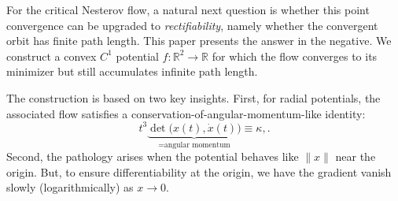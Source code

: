 \documentclass{article}
\theoremstyle{remark}
\begin{document}




For the critical Nesterov flow, a natural next question is whether this point convergence can be upgraded to \emph{rectifiability}, namely whether the convergent orbit has finite path length. This paper presents the answer in the negative. We construct a convex $C^1$ potential $f\colon \mathbb{R}^2\rightarrow\mathbb{R}$ for which the flow converges to its minimizer but still accumulates infinite path length.



The construction is based on two key insights. First, for radial potentials, the associated flow satisfies a conservation-of-angular-momentum-like identity:
\[
  t^3
  \!\!\!
\underbrace{
  \det\big(x(t),\dot x(t)\big)}_{=\text{angular momentum}}\!\!\equiv \kappa,.
\]
Second, the pathology arises when the potential behaves like $\|x\|$ near the origin. But, to ensure differentiability at the origin, we have the gradient vanish slowly (logarithmically) as $x\rightarrow 0$.
\end{document}
